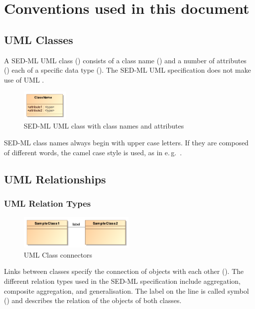 \section{Conventions used in this document}
\label{sec:conventions}


\subsection{UML Classes}
\label{sec:umlconventions}
A SED-ML UML class () consists of a class name () and a number of attributes () each of a specific data type (). The SED-ML UML specification does not make use of UML .
\begin{figure}[h]
\centering
\includegraphics[width=0.2\textwidth]{images/pdf/umlClass}
\caption{SED-ML UML class with class names and attributes}
\label{fig:umlClass}
\end{figure}

SED-ML class names always begin with upper case letters. If they are composed of different words, the camel case style is used, as in e.\,g.\ .

\subsection{UML Relationships}
\subsubsection{UML Relation Types}
\begin{figure}[h]
\centering
\includegraphics[width=0.5\textwidth]{images/pdf/classRelation}
\caption{UML Class connectors}
\label{fig:umlConnectors}
\end{figure}

Links between classes specify the connection of objects with each other (). The different relation types used in the SED-ML specification include aggregation, composite aggregation, and generalisation. The label on the line is called symbol () and describes the relation of the objects of both classes. 

